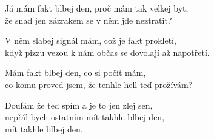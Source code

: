 \cho{}
Já mám fakt blbej den, proč mám tak velkej byt,\\
že snad jen zázrakem se v něm jde neztratit?

V něm slabej signál mám, což je fakt prokletí,\\
když pizzu vezou k nám občas se dovolají až napotřetí.

\cho{}
Mám fakt blbej den, co si počít mám,\\
co komu proved jsem, že tenhle hell teď prožívám?

Doufám že teď spím a je to jen zlej sen,\\
nepřál bych ostatním mít takhle blbej den,\\
mít takhle blbej den.

\esong